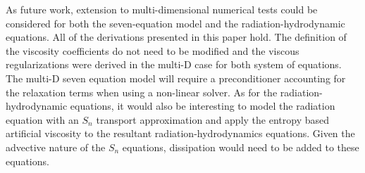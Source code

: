 As future work, extension to multi-dimensional numerical tests could be considered for both the seven-equation model and the radiation-hydrodynamic equations. 
All of the derivations presented in this paper hold. The definition of the viscosity coefficients do not need to be modified and the viscous regularizations were derived in the multi-D case for both system of equations. The multi-D seven equation model will require a preconditioner accounting for the relaxation terms when using a non-linear solver. As for the radiation-hydrodynamic equations, it would also be interesting to model the radiation equation with an $S_n$ transport approximation and apply the entropy based artificial viscosity to the resultant radiation-hydrodynamics equations. Given the advective nature of the $S_n$ equations, dissipation would need to be added to these equations.